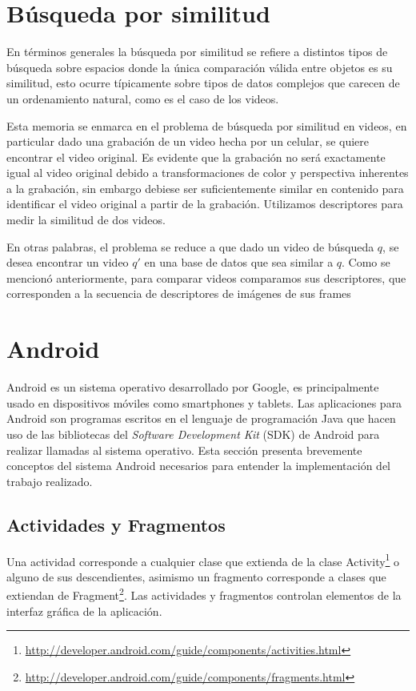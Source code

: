 \section{Búsqueda por similitud}

En términos generales la búsqueda por similitud se refiere a distintos tipos de búsqueda sobre espacios donde la única comparación válida entre objetos es su similitud, esto ocurre típicamente sobre tipos de datos complejos que carecen de un ordenamiento natural, como es el caso de los videos.

Esta memoria se enmarca en el problema de búsqueda por similitud en videos, en particular dado una grabación de un video hecha por un celular, se quiere encontrar el video original. Es evidente que la grabación no será exactamente igual al video original debido a transformaciones de color y perspectiva inherentes a la grabación, sin embargo debiese ser suficientemente similar en contenido para identificar el video original a partir de la grabación. Utilizamos descriptores para medir la similitud de dos videos.

En otras palabras, el problema se reduce a que dado un video de búsqueda $q$, se desea encontrar un video $q'$ en una base de datos que sea similar a $q$.
Como se mencionó anteriormente, para comparar videos comparamos sus descriptores, que corresponden a la secuencia de descriptores de imágenes de sus frames 

\section{Android}
Android es un sistema operativo desarrollado por Google, es principalmente usado en dispositivos móviles como smartphones y tablets. Las aplicaciones para Android son programas escritos en el lenguaje de programación Java que hacen uso de las bibliotecas del \emph{Software Development Kit} (SDK) de Android para realizar llamadas al sistema operativo. Esta sección presenta brevemente conceptos del sistema Android necesarios para entender la implementación del trabajo realizado.

\subsection*{Actividades y Fragmentos}

Una actividad corresponde a cualquier clase que extienda de la clase Activity\footnote{\url{http://developer.android.com/guide/components/activities.html}} o alguno de sus descendientes, asimismo un fragmento corresponde a clases que extiendan de Fragment\footnote{\url{http://developer.android.com/guide/components/fragments.html}}. Las actividades y fragmentos controlan elementos de la interfaz gráfica de la aplicación.

